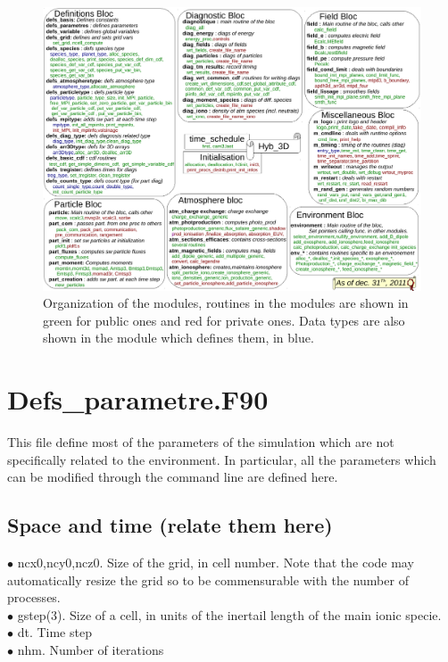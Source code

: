 \documentclass{article}
\begin{document}
\begin{figure}[h]
\centering
\hspace{-1cm}
\includegraphics[width=\linewidth]{hybrid_str.pdf}
\caption{Organization of the modules, routines in the modules are shown in green for public ones and red for private ones. Data types are also shown in the module which defines them, in blue.}
\end{figure}

\section{Defs\_parametre.F90}

This file define most of the parameters of the simulation which are not specifically related to the environment. In particular, all the parameters which can be modified through the command line are defined here.

\subsection{Space and time (relate them here)}
$\bullet$ {\sf ncx0,ncy0,ncz0}. Size of the grid, in cell number. Note that the code may automatically resize the grid so to be commensurable with the number of processes.\\
$\bullet$ {\sf gstep(3)}. Size of a cell, in units of the inertail length of the main ionic specie.\\
$\bullet$ {\sf dt}. Time step\\
$\bullet$ {\sf nhm}. Number of iterations\\
\end{document}
